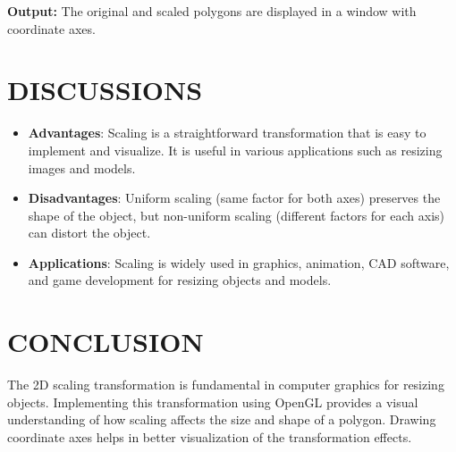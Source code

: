 \documentclass{article}
\begin{document}
\textbf{Output:}
The original and scaled polygons are displayed in a window with coordinate axes.

\section*{DISCUSSIONS}
\begin{itemize}
    \item \textbf{Advantages}: Scaling is a straightforward transformation that is easy to implement and visualize. It is useful in various applications such as resizing images and models.
    \item \textbf{Disadvantages}: Uniform scaling (same factor for both axes) preserves the shape of the object, but non-uniform scaling (different factors for each axis) can distort the object.
    \item \textbf{Applications}: Scaling is widely used in graphics, animation, CAD software, and game development for resizing objects and models.
\end{itemize}

\section*{CONCLUSION}
The 2D scaling transformation is fundamental in computer graphics for resizing objects. Implementing this transformation using OpenGL provides a visual understanding of how scaling affects the size and shape of a polygon. Drawing coordinate axes helps in better visualization of the transformation effects.
\end{document}
